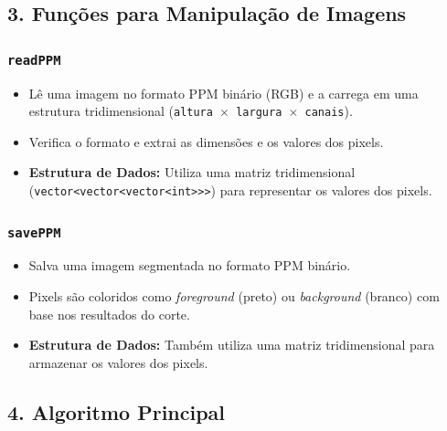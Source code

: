 \documentclass[12pt]{article}
\begin{document}
\subsection*{3. Funções para Manipulação de Imagens}

\subsubsection*{\texttt{readPPM}}
\begin{itemize}
    \item Lê uma imagem no formato PPM binário (RGB) e a carrega em uma estrutura tridimensional (\texttt{altura $\times$ largura $\times$ canais}).
    \item Verifica o formato e extrai as dimensões e os valores dos pixels.
    \item \textbf{Estrutura de Dados:} Utiliza uma matriz tridimensional (\texttt{vector<vector<vector<int>>>}) para representar os valores dos pixels.
\end{itemize}

\subsubsection*{\texttt{savePPM}}
\begin{itemize}
    \item Salva uma imagem segmentada no formato PPM binário.
    \item Pixels são coloridos como \textit{foreground} (preto) ou \textit{background} (branco) com base nos resultados do corte.
    \item \textbf{Estrutura de Dados:} Também utiliza uma matriz tridimensional para armazenar os valores dos pixels.
\end{itemize}

\subsection*{4. Algoritmo Principal}
\end{document}
